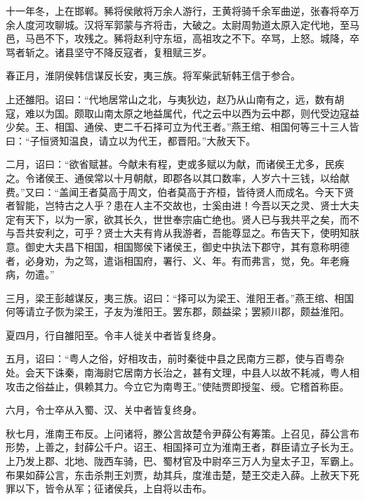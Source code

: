 \documentclass[12pt,UTF8]{ctexbook}
\begin{document}
十一年冬，上在邯郸。豨将侯敞将万余人游行，王黄将骑千余军曲逆，张春将卒万余人度河攻聊城。汉将军郭蒙与齐将击，大破之。太尉周勃道太原入定代地，至马邑，马邑不下，攻残之。豨将赵利守东垣，高祖攻之不下。卒骂，上怒。城降，卒骂者斩之。诸县坚守不降反寇者，复租赋三岁。



春正月，淮阴侯韩信谋反长安，夷三族。将军柴武斩韩王信于参合。



上还雒阳。诏曰：“代地居常山之北，与夷狄边，赵乃从山南有之，远，数有胡寇，难以为国。颇取山南太原之地益属代，代之云中以西为云中郡，则代受边寇益少矣。王、相国、通侯、吏二千石择可立为代王者。”燕王绾、相国何等三十三人皆曰：“子恒贤知温良，请立以为代王，都晋阳。”大赦天下。



二月，诏曰：“欲省赋甚。今献未有程，吏或多赋以为献，而诸侯王尤多，民疾之。令诸侯王、通侯常以十月朝献，即郡各以其口数率，人岁六十三钱，以给献费。”又曰：“盖闻王者莫高于周文，伯者莫高于齐桓，皆待贤人而成名。今天下贤者智能，岂特古之人乎？患在人主不交故也，士奚由进！今吾以天之灵、贤士大夫定有天下，以为一家，欲其长久，世世奉宗庙亡绝也。贤人已与我共平之矣，而不与吾共安利之，可乎？贤士大夫有肯从我游者，吾能尊显之。布告天下，使明知朕意。御史大夫昌下相国，相国酂侯下诸侯王，御史中执法下郡守，其有意称明德者，必身劝，为之驾，遣诣相国府，署行、义、年。有而弗言，觉，免。年老癃病，勿遣。”



三月，梁王彭越谋反，夷三族。诏曰：“择可以为梁王、淮阳王者。”燕王绾、相国何等请立子恢为梁王，子友为淮阳王。罢东郡，颇益梁；罢颍川郡，颇益淮阳。



夏四月，行自雒阳至。令丰人徙关中者皆复终身。



五月，诏曰：“粤人之俗，好相攻击，前时秦徙中县之民南方三郡，使与百粤杂处。会天下诛秦，南海尉它居南方长治之，甚有文理，中县人以故不耗减，粤人相攻击之俗益止，俱赖其力。今立它为南粤王。”使陆贾即授玺、绶。它稽首称臣。



六月，令士卒从入蜀、汉、关中者皆复终身。



秋七月，淮南王布反。上问诸将，滕公言故楚令尹薛公有筹策。上召见，薛公言布形势，上善之，封薛公千户。诏王、相国择可立为淮南王者，群臣请立子长为王。上乃发上郡、北地、陇西车骑，巴、蜀材官及中尉卒三万人为皇太子卫，军霸上。布果如薛公言，东击杀荆王刘贾，劫其兵，度淮击楚，楚王交走入薛。上赦天下死罪以下，皆令从军；征诸侯兵，上自将以击布。
\end{document}

